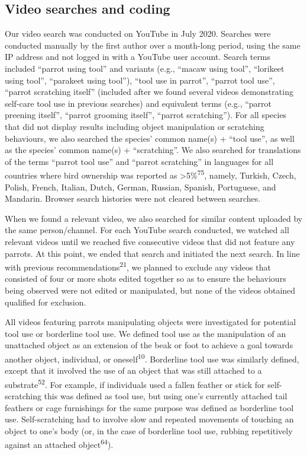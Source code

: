 \documentclass[
  man, donotrepeattitle,floatsintext]{apa6}
\begin{document}
\hypertarget{video-searches-and-coding}{%
\subsection{Video searches and coding}\label{video-searches-and-coding}}

Our video search was conducted on YouTube in July 2020. Searches were conducted
manually by the first author over a month-long period, using the same IP address
and not logged in with a YouTube user account. Search terms included
``parrot using tool'' and variants (e.g., ``macaw using tool'', ``lorikeet using
tool'', ``parakeet using tool''), ``tool use in parrot'', ``parrot tool use'', ``parrot
scratching itself'' (included after we found several videos demonstrating
self-care tool use in previous searches) and equivalent terms (e.g., ``parrot
preening itself'', ``parrot grooming itself'', ``parrot scratching''). For all
species that did not display results including object manipulation or scratching
behaviours, we also searched the species' common name(s) + ``tool use'', as well
as the species' common name(s) + ``scratching''. We also searched for translations
of the terms ``parrot tool use'' and ``parrot scratching'' in languages for all
countries where bird ownership was reported as \textgreater5\%\textsuperscript{75}, namely,
Turkish, Czech, Polish, French, Italian, Dutch, German, Russian, Spanish,
Portuguese, and Mandarin. Browser search histories were not cleared between
searches.

When we found a relevant video, we also searched for similar content uploaded by
the same person/channel. For each YouTube search conducted, we watched all
relevant videos until we reached five consecutive videos that did not feature
any parrots. At this point, we ended that search and initiated the next search.
In line with previous recommendations\textsuperscript{21}, we planned to exclude any
videos that consisted of four or more shots edited together so as to ensure the
behaviours being observed were not edited or manipulated, but none of the videos
obtained qualified for exclusion.

All videos featuring parrots manipulating objects were investigated for
potential tool use or borderline tool use. We defined tool use as the
manipulation of an unattached object as an extension of the beak or foot to
achieve a goal towards another object, individual, or oneself\textsuperscript{10}.
Borderline tool use was similarly defined, except that it involved the use of an
object that was still attached to a substrate\textsuperscript{52}. For example, if
individuals used a fallen feather or stick for self-scratching this was defined
as tool use, but using one's currently attached tail feathers or cage
furnishings for the same purpose was defined as borderline tool use.
Self-scratching had to involve slow and repeated movements of touching an object
to one's body (or, in the case of borderline tool use, rubbing repetitively
against an attached object\textsuperscript{64}).
\end{document}
